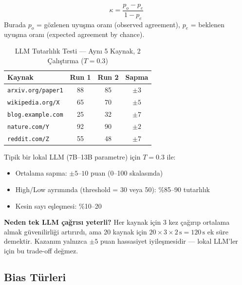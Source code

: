 \begin{formulbox}
\begin{equation}
\label{eq:cohens-kappa}
\kappa = \frac{p_o - p_e}{1 - p_e}
\end{equation}
Burada $p_o$ = g\"{o}zlenen uyu\c{s}ma oran{\i} (observed agreement), $p_e$ = beklenen uyu\c{s}ma oran{\i} (expected agreement by chance).
\end{formulbox}

\begin{table}[H]
\centering
\caption{LLM Tutarl{\i}l{\i}k Testi --- Ayn{\i} 5 Kaynak, 2 \c{C}al{\i}\c{s}t{\i}rma ($T=0.3$)}
\label{tab:inter-rater}
\begin{tabular}{lccc}
\toprule
\color{chapterBlue}\textbf{Kaynak} & \color{chapterBlue}\textbf{Run 1} & \color{chapterBlue}\textbf{Run 2} & \color{chapterBlue}\textbf{Sapma} \\
\midrule
\texttt{arxiv.org/paper1}   & 88 & 85 & $\pm 3$ \\
\texttt{wikipedia.org/X}    & 65 & 70 & $\pm 5$ \\
\texttt{blog.example.com}   & 25 & 32 & $\pm 7$ \\
\texttt{nature.com/Y}       & 92 & 90 & $\pm 2$ \\
\texttt{reddit.com/Z}       & 55 & 48 & $\pm 7$ \\
\bottomrule
\end{tabular}
\end{table}

Tipik bir lokal LLM (7B--13B parametre) i\c{c}in $T=0.3$ ile:
\begin{itemize}
  \item Ortalama sapma: $\pm 5$--$10$ puan (0--100 skalas{\i}nda)
  \item High/Low ayr{\i}m{\i}nda (threshold = 30 veya 50): \%85--90 tutarl{\i}l{\i}k
  \item Kesin say{\i} e\c{s}le\c{s}mesi: \%10--20
\end{itemize}

\textbf{Neden tek LLM \c{c}a\u{g}r{\i}s{\i} yeterli?} Her kaynak i\c{c}in 3 kez \c{c}a\u{g}{\i}r{\i}p ortalama almak g\"{u}venilirli\u{g}i art{\i}r{\i}rd{\i}, ama 20 kaynak i\c{c}in $20 \times 3 \times 2\,\text{s} = 120\,\text{s}$ ek s\"{u}re demektir. Kazan{\i}m yaln{\i}zca $\pm 5$ puan hassasiyet iyile\c{s}mesidir --- lokal LLM'ler i\c{c}in bu trade-off de\u{g}mez.

\subsection{Bias T\"{u}rleri}

